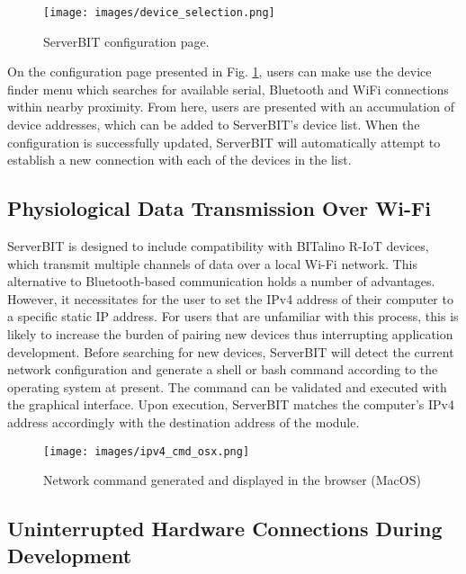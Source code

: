\begin{figure}[htb!]
    \centering
    \texttt{[image: images/device\_selection.png]}
    \caption{ServerBIT configuration page.}
    \label{fig:dev_selection}
\end{figure}

On the configuration page presented in Fig. \ref{fig:dev_selection}, users can make use the device finder menu which searches for available serial, Bluetooth and WiFi connections within nearby proximity. From here, users are presented with an accumulation of device addresses, which can be added to ServerBIT's device list. When the configuration is successfully updated, ServerBIT will automatically attempt to establish a new connection with each of the devices in the list.

\subsection{Physiological Data Transmission Over Wi-Fi} \label{riot}

ServerBIT is designed to include compatibility with BITalino R-IoT devices, which transmit multiple channels of data over a local Wi-Fi network. This alternative to Bluetooth-based communication holds a number of advantages. However, it necessitates for the user to set the IPv4 address of their computer to a specific static IP address. For users that are unfamiliar with this process, this is likely to increase the burden of pairing new devices thus interrupting application development. Before searching for new devices, ServerBIT will detect the current network configuration and generate a shell or bash command according to the operating system at present. The command can be validated and executed with the graphical interface. Upon execution, ServerBIT matches the computer's IPv4 address accordingly with the destination address of the module.

\begin{figure}[ht]
    \centering
    \texttt{[image: images/ipv4\_cmd\_osx.png]}
    \caption{Network command generated and displayed in the browser (MacOS)}
    \label{fig:cmd_osx}
\end{figure}

\subsection{Uninterrupted Hardware Connections During Development}

